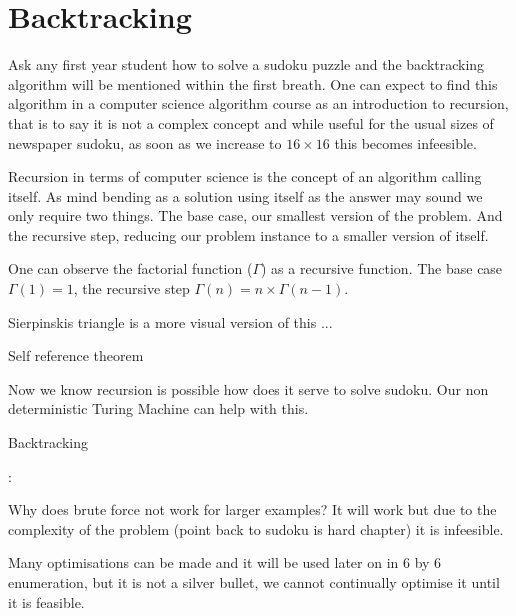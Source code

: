 \documentclass[a4paper,11pt]{report}
\newcounter{row}
\newcounter{col}
\begin{document}
\section{Backtracking}
Ask any first year student how to solve a sudoku puzzle and the backtracking algorithm will be mentioned within the first breath. One can expect to find this algorithm in a computer science algorithm course as an introduction to recursion, that is to say it is not a complex concept and while useful for the usual sizes of newspaper sudoku, as soon as we increase to $16 \times 16$ this becomes infeesible.

Recursion in terms of computer science is the concept of an algorithm calling itself. As mind bending as a solution using itself as the answer may sound we only require two  things. The base case, our smallest version of the problem. And the recursive step, reducing our problem instance to a smaller version of itself. 

One can observe the factorial function ($\Gamma$) as a recursive function. The base case $\Gamma(1)=1$, the recursive step $\Gamma(n)=n\times \Gamma(n-1)$.

Sierpinskis triangle is a more visual version of this ...

Self reference theorem 

Now we know recursion is possible how does it serve to solve sudoku. Our non deterministic Turing Machine can help with this.

\begin{algorithm}
\caption{Backtracking}
\begin{algorithmic}
                \Else:
	       \EndIf
		\EndIf
\EndIf
\EndFor
\EndFor
\EndProcedure						
\end{algorithmic}
\end{algorithm}

Why does brute force not work for larger examples? It will work but due to the complexity of the problem (point back to sudoku is hard chapter) it is infeesible.

Many optimisations can be made and it will be used later on in 6 by 6 enumeration, but it is not a silver bullet, we cannot continually optimise it until it is feasible.
\end{document}
